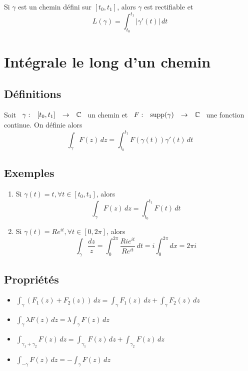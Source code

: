 \documentclass[]{report}
\begin{document}
\begin{prop}
    Si $\gamma$ est un chemin défini sur $[t_0,t_1]$, alors $\gamma$ est rectifiable et $$L(\gamma)=\int_{t_0}^{t_1} |\gamma'(t)| \,dt$$
\end{prop}

\section{Intégrale le long d'un chemin}

\subsection{Définitions}

Soit $\begin{array}{ccccc}
\gamma : & [t_0,t_1] & \to & \mathbb{C}
\end{array}$ un chemin et $\begin{array}{ccccc}
F : & \text{supp}(\gamma) & \to & \mathbb{C}
\end{array}$ une fonction continue. On définie alors $$\int_{\gamma} F(z) \,dz=\int_{t_0}^{t_1} F(\gamma(t))\gamma'(t) \,dt$$

\subsection{Exemples}

\begin{enumerate}
    \item Si $\gamma(t)=t,\forall t\in [t_0,t_1]$, alors $$\int_{\gamma} F(z) \,dz=\int_{t_0}^{t_1} F(t) \,dt$$
    \item Si $\gamma(t)=Re^{it},\forall t\in[0,2\pi]$, alors $$\int_{\gamma}\frac{dz}{z}=\int_{0}^{2\pi} \frac{Rie^{it}}{Re^{it}} \,dt=i\int_{0}^{2\pi} dx=2\pi i$$
\end{enumerate}

\subsection{Propriétés}

\begin{itemize}
    \item $\int_{\gamma} (F_1(z) +F_2(z))\,dz=\int_{\gamma} F_1(z) \,dz+\int_{\gamma} F_2(z) \,dz$
    \item $\int_{\gamma} \lambda F(z) \,dz=\lambda\int_{\gamma} F(z) \,dz$
    \item $\int_{\gamma_1+\gamma_2} F(z) \,dz=\int_{\gamma_1} F(z) \,dz+\int_{\gamma_2} F(z) \,dz$
    \item $\int_{-\gamma} F(z) \,dz=-\int_{\gamma} F(z) \,dz$
\end{itemize}
\end{document}
